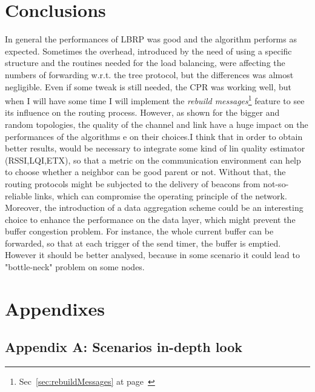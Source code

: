 \documentclass{article}
\begin{document}
\section{Conclusions}
In general the performances of LBRP was good and the algorithm performs as expected. Sometimes the overhead, introduced by the need of using a specific structure and the routines needed for the load balancing, were affecting the numbers of forwarding w.r.t. the tree protocol, but the differences was almost negligible. Even if some tweak is still needed, the CPR was working well, but when I will have some time I will implement the \textit{rebuild messages}\footnote{Sec~\ref{sec:rebuildMessages} at page~\pageref{sec:rebuildMessages}} feature to see its influence on the routing process.
However, as shown for the bigger and random topologies, the quality of the channel and link have a huge impact on the performances of the algorithms e on their choices.I think that in order to obtain better results, would be necessary to integrate some kind of lin quality estimator (RSSI,LQI,ETX), so that a metric on the communication environment can help to choose whether a neighbor can be good parent or not. Without that, the routing protocols might be subjected to the delivery of beacons from not-so-reliable links, which can compromise the operating principle of the network. Moreover, the introduction of a data aggregation scheme could be an interesting choice to enhance the performance on the data layer, which might prevent the buffer congestion problem. For instance, the whole current buffer can be forwarded, so that at each trigger of the send timer, the buffer is emptied. However it should be better analysed, because in some scenario it could lead to "bottle-neck" problem on some nodes.
\clearpage
\section{Appendixes}
\subsection{Appendix A: Scenarios in-depth look}
\end{document}
